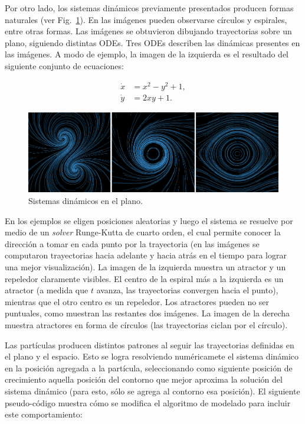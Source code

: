 \documentclass[oneside,a4paper,spanish,links]{amca}
\begin{document}
Por otro lado, los sistemas din\'amicos previamente presentados producen formas naturales (ver Fig.~\ref{fg:fig3}). En las im\'agenes pueden observarse c\'irculos y espirales, entre otras formas. Las im\'agenes se obtuvieron dibujando trayectorias sobre un plano, siguiendo distintas ODEs. Tres ODEs describen las din\'amicas presentes en las im\'agenes. A modo de ejemplo, la imagen de la izquierda es el resultado del siguiente conjunto de ecuaciones:

\begin{equation} \label{eq:simple}  
  \begin{aligned}
    \dot{x} &= x^{2}-y^{2}+1,\\
    \dot{y} &= 2xy+1.
  \end{aligned}
\end{equation}


\begin{figure}[htb!]
  \centerline{\includegraphics[scale=0.28]{fig3}}
  \caption{Sistemas din\'amicos en el plano.}
  \label{fg:fig3}
\end{figure}

En los ejemplos se eligen posiciones aleatorias y luego el sistema se resuelve por medio de un {\em solver} Runge-Kutta de cuarto orden, el cual permite conocer la direcci\'on a tomar en cada punto por la trayectoria (en las im\'agenes se computaron trayectorias hacia adelante y hacia atrás en el tiempo para lograr una mejor visualizaci\'on). La imagen de la izquierda muestra un atractor y un repeledor claramente visibles. El centro de la espiral m\'as a la izquierda es un atractor (a medida que $t$ avanza, las trayectorias convergen hacia el punto), mientras que el otro centro es un repeledor. Los atractores pueden no ser puntuales, como muestran las restantes dos im\'agenes. La imagen de la derecha muestra atractores en forma de c\'irculos (las trayectorias ciclan por el c\'irculo).

Las part\'iculas producen distintos patrones al seguir las trayectorias definidas en el plano y el espacio. Esto se logra resolviendo num\'ericamete el sistema din\'amico en la posici\'on agregada a la part\'icula, seleccionando como siguiente posici\'on de crecimiento aquella posici\'on del contorno que mejor aproxima la soluci\'on del sistema din\'amico (para esto, sólo se agrega al contorno esa posición). El siguiente pseudo-código muestra cómo se modifica el algoritmo de modelado para incluir este comportamiento:
\end{document}
